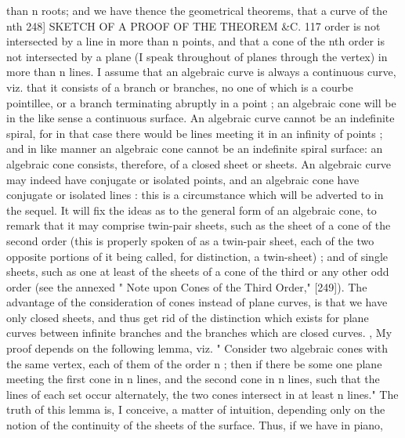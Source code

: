 \documentclass[11pt,a4paper]{book}
\begin{document}
than  n  roots;   and   we   have   thence   the  geometrical   theorems,  that  a  curve  of  the  nth
248]  SKETCH    OF    A   PROOF   OF   THE   THEOREM   \&C.  117
order  is  not  intersected  by  a  line  in  more  than  n  points,  and  that  a  cone  of  the
nth  order  is  not  intersected  by  a  plane  (I  speak  throughout  of  planes  through  the
vertex)  in  more  than  n  lines.  I  assume  that  an  algebraic  curve  is  always  a  continuous
curve,  viz.  that  it  consists  of  a  branch  or  branches,  no  one  of  which  is  a  courbe
pointillee,  or  a  branch  terminating  abruptly  in  a  point ;  an  algebraic  cone  will  be  in
the  like  sense  a  continuous  surface.  An  algebraic  curve  cannot  be  an  indefinite
spiral,  for  in  that  case  there  would  be  lines  meeting  it  in  an  infinity  of  points ;  and
in  like  manner  an  algebraic  cone  cannot  be  an  indefinite  spiral  surface:  an  algebraic
cone  consists,  therefore,  of  a  closed  sheet  or  sheets.  An  algebraic  curve  may  indeed
have  conjugate  or  isolated  points,  and  an  algebraic  cone  have  conjugate  or  isolated
lines :  this  is  a  circumstance  which  will  be  adverted  to  in  the  sequel.  It  will  fix  the
ideas  as  to  the  general  form  of  an  algebraic  cone,  to  remark  that  it  may  comprise
twin-pair  sheets,  such  as  the  sheet  of  a  cone  of  the  second  order  (this  is  properly
spoken  of  as  a  twin-pair  sheet,  each  of  the  two  opposite  portions  of  it  being  called,
for  distinction,  a  twin-sheet) ;  and  of  single  sheets,  such  as  one  at  least  of  the  sheets
of  a  cone  of  the  third  or  any  other  odd  order  (see  the  annexed  "  Note  upon  Cones
of  the  Third  Order,"  [249]).  The  advantage  of  the  consideration  of  cones  instead  of
plane  curves,  is  that  we  have  only  closed  sheets,  and  thus  get  rid  of  the  distinction
which  exists  for  plane  curves  between  infinite  branches  and  the  branches  which  are
closed  curves.  ,
My  proof  depends  on  the  following  lemma,  viz.  "  Consider  two  algebraic  cones  with
the  same  vertex,  each  of  them  of  the  order  n ;  then  if  there  be  some  one  plane
meeting  the  first  cone  in  n  lines,  and  the  second  cone  in  n  lines,  such  that  the
lines  of  each  set  occur  alternately,  the  two  cones  intersect  in  at  least  n  lines."
The  truth  of  this  lemma  is,  I  conceive,  a  matter  of  intuition,  depending  only  on
the  notion  of  the  continuity  of  the  sheets  of  the  surface.  Thus,  if  we  have  in  piano,
\end{document}

